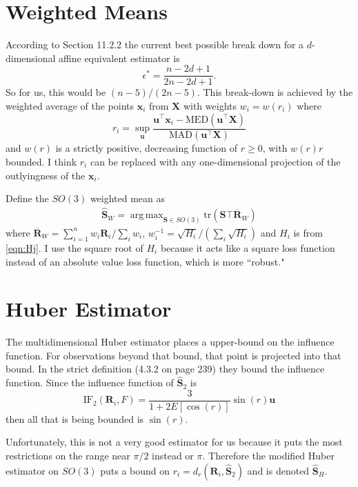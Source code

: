 \documentclass{article}\usepackage[]{graphicx}\usepackage[]{color}
\DeclareMathOperator*{\argmax}{arg\,max}
\newcommand{\ProjMean}{{\widehat{\bm S}_{2}}}
\newcommand{\HuberMean}{{\widehat{\bm S}_H}}
\newcommand{\WeightMean}{{\widehat{\bm S}_W}}
\begin{document}
\section{Weighted Means}

According to \cite{huber2009} Section 11.2.2 the current best possible break down for a $d$-dimensional affine equivalent estimator is
\[
\epsilon^*=\frac{n-2d+1}{2n-2d+1}.
\]
So for us, this would be $(n-5)/(2n-5)$.  This break-down is achieved by the weighted average of the points $\bm x_i$ from $\bm X$ with weights $w_i=w(r_i)$ where
\[
r_i=\sup_{\bm u}\frac{\bm u^\top\bm x_i-\text{MED}(\bm u^\top\bm X)}{\text{MAD}(\bm u^\top\bm X)}
\]
and $w(r)$ is a strictly positive, decreasing function of $r\geq 0$, with $w(r)r$ bounded.  I think $r_i$ can be replaced with any one-dimensional projection of the outlyingness of the $\bm x_i$.  

Define the $SO(3)$ weighted mean as
\begin{align*}
\WeightMean=\argmax_{\bm S\in SO(3)}\text{tr}(\bm S\top\overline{\bm R}_W)
\end{align*}
where $\overline{\bm R}_W=\sum_{i=1}^nw_i\bm R_i/\sum_i w_i$, $w_i^{-1}=\sqrt{H_i}/(\sum_i \sqrt{H_i})$ and $H_i$ is from \eqref{eqn:Hj}.  I use the square root of $H_i$ because it acts like a square loss function instead of an absolute value loss function, which is more ``robust."







\section{Huber Estimator}

The multidimensional Huber estimator \citep{hampel2011} places a upper-bound on the influence function.  For observations beyond that bound, that point is projected into that bound. In the strict definition (4.3.2 on page 239) they bound the influence function.  Since the influence function of $\ProjMean$ is
\[
\text{IF}_2(\bm R_i,F)=\frac{3}{1+2E[\cos(r)]}\sin(r)\bm u
\]
then all that is being bounded is $\sin(r)$.  

Unfortunately, this is not a very good estimator for us because it puts the most restrictions on the range near $\pi/2$ instead or $\pi$.  Therefore the modified Huber estimator on $SO(3)$ puts a bound on $r_i=d_r(\bm R_i,\ProjMean)$ and is denoted $\HuberMean$.
\end{document}
